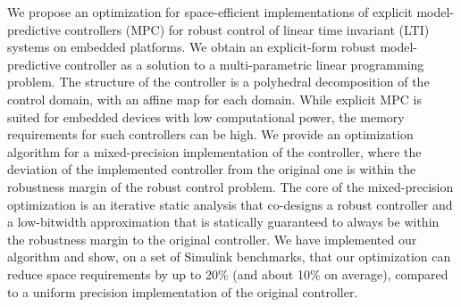 We propose an optimization for space-efficient implementations of explicit model-predictive controllers (MPC)
for robust control of linear time invariant (LTI) systems on embedded platforms. 
We obtain an explicit-form robust model-predictive controller as a solution to a multi-parametric 
linear programming problem.
The structure of the controller is a polyhedral decomposition of the control domain,
with an affine map for each domain.
While explicit MPC is suited for embedded devices with low computational power, the memory requirements
for such controllers can be high.
We provide an optimization algorithm for a mixed-precision implementation of the controller,
where the deviation of the implemented controller from the original one is within the robustness
margin of the robust control problem.
The core of the mixed-precision optimization is an iterative static analysis that co-designs
a robust controller and a low-bitwidth approximation 
that is statically guaranteed to always be within the robustness margin to the original controller.
We have implemented our algorithm and show, on a set of Simulink benchmarks, that our optimization
can reduce space requirements by up to 20\% (and about 10\% on average), compared to a uniform precision
implementation of the original controller.

